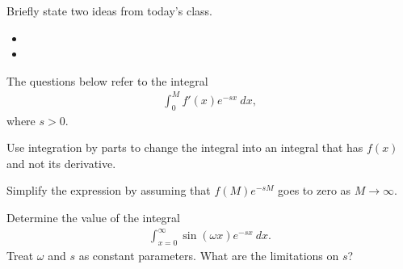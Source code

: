 \begin{problem}
\item Briefly state two ideas from today's class.
  \begin{itemize}
  \item
  \item
  \end{itemize}
\item The questions below refer to the integral
\begin{eqnarray*}
  \int^M_0 f'(x) e^{-sx} ~ dx,
\end{eqnarray*}
where $s>0$.
  \begin{subproblem}
    \item Use integration by parts to change the integral into an integral
    that has $f(x)$ and not its derivative.
     \vfill
     \item Simplify the expression by assuming that $f(M)e^{-sM}$ goes to zero as $M\rightarrow\infty$.
     \
  \end{subproblem}
  \item Determine the value of the integral
    \begin{eqnarray*}
      \int_{x=0}^\infty \sin(\omega x) e^{-sx} ~ dx.
    \end{eqnarray*}
    Treat $\omega$ and $s$ as constant parameters. What are the limitations on $s$?

\end{problem}


\preClass{Integraton}

